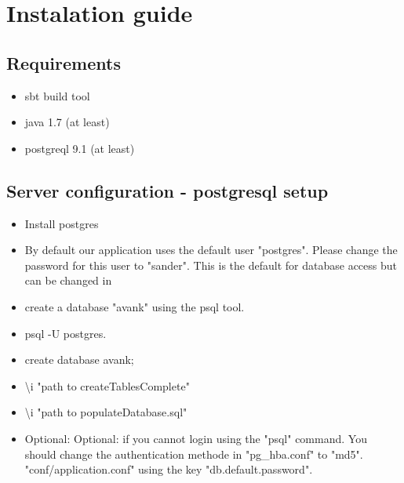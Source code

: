\documentclass[11pt]{article}
\date{}
\begin{document}
\section{Instalation guide}
\subsection{Requirements}
\begin{itemize}
\item sbt build tool
\item java 1.7 (at least)
\item postgreql 9.1 (at least)
\end{itemize}

\subsection{Server configuration - postgresql setup}
\begin{itemize}
\item Install postgres
\item  By default our application uses the default user "postgres". Please change the password for this user to "sander". This is the default for database access but can be changed in
\item create a database "avank" using the psql tool.
\item psql -U postgres.
\item create database avank;
\item \textbackslash i "path to createTablesComplete"
\item \textbackslash i "path to populateDatabase.sql"
\item  Optional: Optional: if you cannot login using the "psql" command. You should change the authentication methode in "pg\_hba.conf" to "md5". 
"conf/application.conf" using the key "db.default.password".
\end{itemize}
\end{document}
